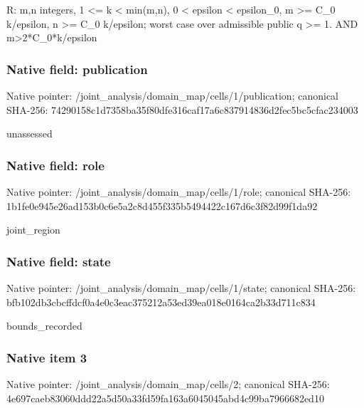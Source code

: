 \documentclass[10pt,a4paper]{article}
\begin{document}
\begingroup\raggedright\sloppy R:\allowbreak{} m,\allowbreak{}n integers,\allowbreak{} 1 <=\allowbreak{} k < min(m,\allowbreak{}n),\allowbreak{} 0 < epsilon < epsilon\_\allowbreak{}0,\allowbreak{} m >=\allowbreak{} C\_\allowbreak{}0 k/\allowbreak{}epsilon,\allowbreak{} n >=\allowbreak{} C\_\allowbreak{}0 k/\allowbreak{}epsilon;\allowbreak{} worst case over admissible public q >=\allowbreak{} 1. AND m>2*C\_\allowbreak{}0*k/\allowbreak{}epsilon\par\endgroup

\subsubsection{Native field: publication}
Native pointer: /joint\_\allowbreak{}analysis/domain\_\allowbreak{}map/cells/1/publication; canonical SHA-256: 74290158c1d7358ba35f80dfe316caf17a6c837914836d2fec5bc5cfac234003

\begingroup\raggedright\sloppy unassessed\par\endgroup

\subsubsection{Native field: role}
Native pointer: /joint\_\allowbreak{}analysis/domain\_\allowbreak{}map/cells/1/role; canonical SHA-256: 1b1fe0e945e26ad153b0c6e5a2c8d455f335b5494422c167d6c3f82d99f1da92

\begingroup\raggedright\sloppy joint\_\allowbreak{}region\par\endgroup

\subsubsection{Native field: state}
Native pointer: /joint\_\allowbreak{}analysis/domain\_\allowbreak{}map/cells/1/state; canonical SHA-256: bfb102db3cbcffdcf0a4e0c3eac375212a53ed39ea018e0164ca2b33d711c834

\begingroup\raggedright\sloppy bounds\_\allowbreak{}recorded\par\endgroup

\subsubsection{Native item 3}
Native pointer: /joint\_\allowbreak{}analysis/domain\_\allowbreak{}map/cells/2; canonical SHA-256: 4e697caeb83060ddd22a5d50a33fd59fa163a6045045abd4c99ba7966682ed10
\end{document}
